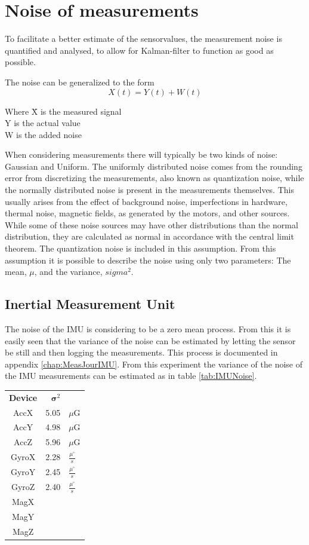 \chapter{Noise of measurements}
To facilitate a better estimate of the sensorvalues, the measurement noise is quantified and analysed, to allow for Kalman-filter to function as good as possible.

The noise can be generalized to the form
\begin{equation}
X(t) = Y(t) + W(t)
\end{equation}
\begin{tabbing}
Where \= X is the measured signal\\
	\> Y is the actual value\\
	\> W is the added noise 
\end{tabbing}
When considering measurements there will typically be two kinds of noise: Gaussian and Uniform. The uniformly distributed noise comes from the rounding error from discretizing the measurements, also known as quantization noise, while the normally distributed noise is present in the measurements themselves. This usually arises from the effect of background noise, imperfections in hardware, thermal noise, magnetic fields, as generated by the motors, and other sources. While some of these noise sources may have other distributions than the normal distribution, they are calculated as normal in accordance with the central limit theorem. The quantization noise is included in this assumption. From this assumption it is possible to describe the noise using only two parameters: The mean, $\mu$, and the variance, $sigma^{2}$.

\section{Inertial Measurement Unit}
The noise of the IMU is considering to be a zero mean process. From this it is easily seen that the variance of the noise can be estimated by letting the sensor be still and then logging the measurements. This process is documented in appendix \ref{chap:MeasJourIMU}. From this experiment the variance of the noise of the IMU measurements can be estimated as in table \ref{tab:IMUNoise}.

\begin{table}
\begin{tabular}{c|r l}
\textbf{Device} & $\boldsymbol\sigma ^2$ &\\
AccX & 5.05 & $\mu$G \\
AccY & 4.98 & $\mu$G \\
AccZ & 5.96 & $\mu$G \\
GyroX & 2.28 & $\frac{\mu ^\circ}{s}$\\
GyroY & 2.45 & $\frac{\mu ^\circ}{s}$\\
GyroZ & 2.40 & $\frac{\mu ^\circ}{s}$\\
MagX & & \\
MagY & & \\
MagZ & &\\
\end{tabular}
\end{table}
\label{tab:IMUNoise}

